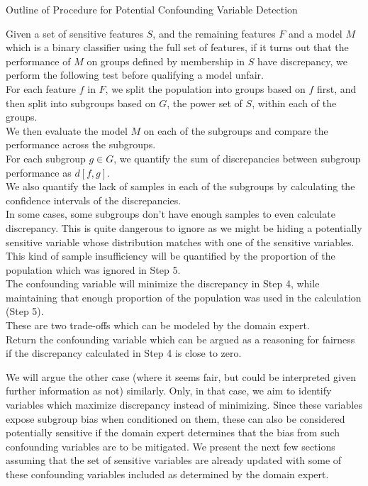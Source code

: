 \begin{algorithm}
\caption{Outline of Procedure for Potential Confounding Variable Detection}
\label{alg:algorithm-confound}
Given a set of sensitive features $S$, and the remaining features $F$ and a model $M$ which is  a binary classifier using the full set of features, if it turns out that the performance of $M$ on groups defined by membership in $S$ have discrepancy, we perform the following test before qualifying a model unfair.\\
For each feature $f$ in $F$, we split the population into groups based on $f$ first, and then split into subgroups based on $G$, the power set of $S$, within each of the groups.\\
We then evaluate the model $M$ on each of the subgroups and compare the performance across the subgroups.\\
For each subgroup $g \in G$, we quantify the sum of discrepancies between subgroup performance as $d[f, g]$.\\
We also quantify the lack of samples in each of the subgroups by calculating the confidence intervals of the discrepancies.\\
In some cases, some subgroups don't have enough samples to even calculate discrepancy. This is quite dangerous to ignore as we might be hiding a potentially sensitive variable whose distribution matches with one of the sensitive variables.\\
This kind of sample insufficiency will be quantified by the proportion of the population which was ignored in Step 5.\\
The confounding variable will minimize the discrepancy in Step 4, while maintaining that enough proportion of the population was used in the calculation (Step 5).\\
These are two trade-offs which can be modeled by the domain expert.\\
Return the confounding variable which can be argued as a reasoning for fairness if the discrepancy calculated in Step 4 is close to zero.\\
\end{algorithm}

We will argue the other case (where it seems fair, but could be interpreted given further information as not) similarly. Only, in that case, we aim to identify variables which maximize discrepancy instead of minimizing. Since these variables expose subgroup bias when conditioned on them, these can also be considered potentially sensitive if the domain expert determines that the bias from such confounding variables are to be mitigated. We present the next few sections assuming that the set of sensitive variables are already updated with some of these confounding variables included as determined by the domain expert.

